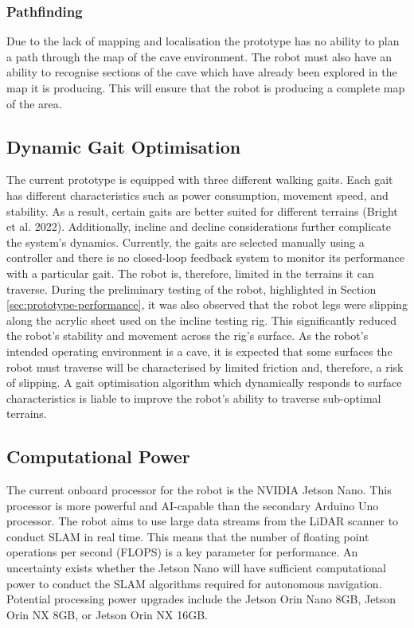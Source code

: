 \subsubsection{Pathfinding}
Due to the lack of mapping and localisation the prototype has no ability to plan a path through the map of the cave environment. The robot must also have an ability to recognise sections of the cave which have already been explored in the map it is producing. This will ensure that the robot is producing a complete map of the area.

\subsection{Dynamic Gait Optimisation}
The current prototype is equipped with three different walking gaits. Each gait has different characteristics such as power consumption, movement speed, and stability. As a result, certain gaits are better suited for different terrains (Bright et al. 2022). Additionally, incline and decline considerations further complicate the system's dynamics. Currently, the gaits are selected manually using a controller and there is no closed-loop feedback system to monitor its performance with a particular gait. The robot is, therefore, limited in the terrains it can traverse. During the preliminary testing of the robot, highlighted in Section \ref{sec:prototype-performance}, it was also observed that the robot legs were slipping along the acrylic sheet used on the incline testing rig. This significantly reduced the robot's stability and movement across the rig's surface. As the robot's intended operating environment is a cave, it is expected that some surfaces the robot must traverse will be characterised by limited friction and, therefore, a risk of slipping. A gait optimisation algorithm which dynamically responds to surface characteristics is liable to improve the robot's ability to traverse sub-optimal terrains.


\subsection{Computational Power}
The current onboard processor for the robot is the NVIDIA Jetson Nano. This processor is more powerful and AI-capable than the secondary Arduino Uno processor. The robot aims to use large data streams from the LiDAR scanner to conduct SLAM in real time. This means that the number of floating point operations per second (FLOPS) is a key parameter for performance. An uncertainty exists whether the Jetson Nano will have sufficient computational power to conduct the SLAM algorithms required for autonomous navigation. Potential processing power upgrades include the Jetson Orin Nano 8GB, Jetson Orin NX 8GB, or Jetson Orin NX 16GB.

